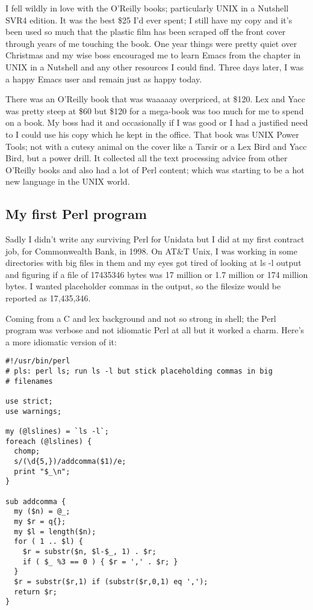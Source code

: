 \documentclass{article}      %
\begin{document}
I fell wildly in love with the O'Reilly books; particularly UNIX in a
Nutshell SVR4 edition. It was the best \$25 I'd ever spent; I still
have my copy and it's been used so much that the plastic film has been
scraped off the front cover through years of me touching the
book. One year things were pretty quiet over Christmas and my wise
boss encouraged me to learn Emacs from the chapter in UNIX in a
Nutshell and any other resources I could find. Three days later, I was
a happy Emacs user and remain just as happy today.

There was an O'Reilly book that was waaaaay overpriced, at \$120. Lex
and Yacc was pretty steep at \$60 but \$120 for a mega-book was too
much for me to spend on a book. My boss had it and occasionally if I
was good or I had a justified need to I could use his copy which he
kept in the office. That book was UNIX Power Tools; not with a
cutesy animal on the cover like a Tarsir or a Lex Bird and Yacc Bird,
but a power drill. It collected all the text processing advice from
other O'Reilly books and also had a lot of Perl content; which was
starting to be a hot new language in the UNIX world.

\subsection{My first Perl program}

Sadly I didn't write any surviving Perl for Unidata but I did at my
first contract job, for Commonwealth Bank, in 1998. On AT\&T Unix, I
was working in some directories with big files in them and my eyes got
tired of looking at ls -l output and figuring if a file of 17435346
bytes was 17 million or 1.7 million or 174 million bytes. I wanted
placeholder commas in the output, so the filesize would be reported
as 17,435,346.

Coming from a C and lex background and not so strong in shell; the
Perl program was verbose and not idiomatic Perl at all but it worked a
charm. Here's a more idiomatic version of it:

\begin{verbatim}
#!/usr/bin/perl
# pls: perl ls; run ls -l but stick placeholding commas in big
# filenames

use strict;
use warnings;

my (@lslines) = `ls -l`;
foreach (@lslines) {
  chomp;
  s/(\d{5,})/addcomma($1)/e;
  print "$_\n";
}

sub addcomma {
  my ($n) = @_;
  my $r = q{};
  my $l = length($n);
  for ( 1 .. $l) {
    $r = substr($n, $l-$_, 1) . $r;
    if ( $_ %3 == 0 ) { $r = ',' . $r; }
  }
  $r = substr($r,1) if (substr($r,0,1) eq ',');
  return $r;
}

\end{verbatim}
\end{document}
